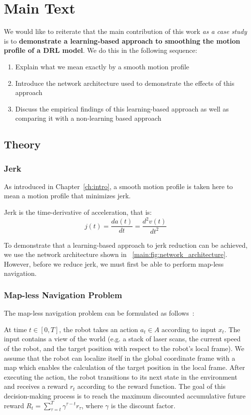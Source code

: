 
\chapter{Main Text}
\label{ch:main}
\vspace{2em}

We would like to reiterate that the main contribution of this work \textit{as a case study} is to \textbf{demonstrate a learning-based approach to smoothing the motion profile of a DRL model}. We do this in the following sequence:
\begin{enumerate}
\item Explain what we mean exactly by a smooth motion profile
\item Introduce the network architecture used to demonstrate the effects of this approach
\item Discuss the empirical findings of this learning-based approach as well as comparing it with a non-learning based approach
\end{enumerate}

\section{Theory}
\subsection{Jerk}
As introduced in Chapter~\ref{ch:intro}, a smooth motion profile is taken here to mean a motion profile that minimizes jerk.

Jerk is the time-derivative of acceleration, that is:
\begin{equation}
j(t) = \frac{da(t)}{dt} = \frac{d^2 v(t)}{dt^2}
\end{equation}

To demonstrate that a learning-based approach to jerk reduction can be achieved, we use the network architecture shown in ~\autoref{main:fig:network_architecture}. However, before we reduce jerk, we must first be able to perform map-less navigation.

\subsection{Map-less Navigation Problem}
The map-less navigation problem can be formulated as follows~\cite{xie_learning_2018}:

At time $t \in [0, T]$, the robot takes an action $a_{t} \in A$ according to input $x_{t}$. The input contains a view of the world (e.g. a stack of laser scans, the current speed of the robot, and the target position with respect to the robot's local frame). We assume that the robot can localize itself in the global coordinate frame with a map which enables the calculation of the target position in the local frame. After executing the action, the robot transitions to its next state in the environment and receives a reward $r_{t}$ according to the reward function. The goal of this decision-making process is to reach the maximum discounted accumulative future reward $R_{t} = \sum_{\tau = t}^{T} \gamma^{\tau - t} r_{\tau}$, where $\gamma$ is the discount factor.

